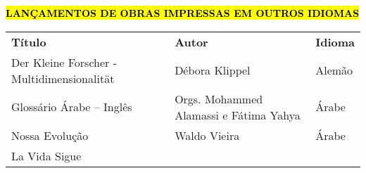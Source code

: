 \documentclass[
]{article}
\begin{document}
\textbf{\hl{LANÇAMENTOS DE OBRAS IMPRESSAS EM OUTROS IDIOMAS}}

\begin{longtable}[]{@{}
  >{\raggedright\arraybackslash}p{}
  >{\raggedright\arraybackslash}p{}
  >{\raggedright\arraybackslash}p{}@{}}
\toprule\noalign{}
\begin{minipage}[b]{\linewidth}\centering
\textbf{Título}
\end{minipage} & \begin{minipage}[b]{\linewidth}\centering
\textbf{Autor}
\end{minipage} & \begin{minipage}[b]{\linewidth}\centering
\textbf{Idioma}
\end{minipage} \\
\begin{minipage}[b]{\linewidth}\raggedright
Der Kleine Forscher - Multidimensionalität
\end{minipage} & \begin{minipage}[b]{\linewidth}\raggedright
Débora Klippel
\end{minipage} & \begin{minipage}[b]{\linewidth}\raggedright
Alemão
\end{minipage} \\
\begin{minipage}[b]{\linewidth}\raggedright
Glossário Árabe -- Inglês
\end{minipage} & \begin{minipage}[b]{\linewidth}\raggedright
Orgs. Mohammed Alamassi e Fátima Yahya
\end{minipage} & \begin{minipage}[b]{\linewidth}\raggedright
Árabe
\end{minipage} \\
\begin{minipage}[b]{\linewidth}\raggedright
Nossa Evolução
\end{minipage} & \begin{minipage}[b]{\linewidth}\raggedright
Waldo Vieira
\end{minipage} & \begin{minipage}[b]{\linewidth}\raggedright
Árabe
\end{minipage} \\
\begin{minipage}[b]{\linewidth}\raggedright
La Vida Sigue
\end{minipage} & \begin{minipage}[b]{\linewidth}\raggedright

\end{minipage}
\end{longtable}
\end{document}
